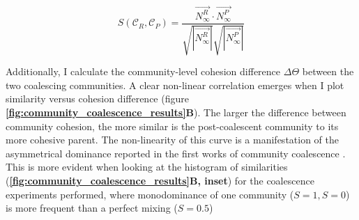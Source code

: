 \documentclass[titlepage,11pt]{article}
\begin{document}
\begin{linenumbers}
\begin{singlespace}
			\begin{linenomath*}
				\begin{equation}
					S(\mathcal{C}_R, \mathcal{C}_P) = \frac{\vec{N^R_{\infty}} \cdot \vec{N^P_{\infty}}}{\sqrt{|\vec{N^R_{\infty}}|}\sqrt{|\vec{N^P_{\infty}}|}}
				\end{equation}
			\end{linenomath*}
			Additionally, I calculate the community-level cohesion difference $ \Delta \Theta $ between the two coalescing communities. A clear non-linear correlation emerges when I plot similarity versus cohesion difference (figure \textbf{\ref{fig:community_coalescence_results}B}). The larger the difference between community cohesion, the more similar is the post-coalescent community to its more cohesive parent. The non-linearity of this curve is a manifestation of the asymmetrical dominance reported in the first works of community coalescence \citep{Gilpin1994}. This is more evident when looking at the histogram of similarities (\textbf{\ref{fig:community_coalescence_results}B, inset}) for the coalescence experiments performed, where monodominance of one community ($ S = 1, S = 0 $) is more frequent than a perfect mixing ($ S = 0.5 $)

\end{singlespace}
\end{linenumbers}
\end{document}
